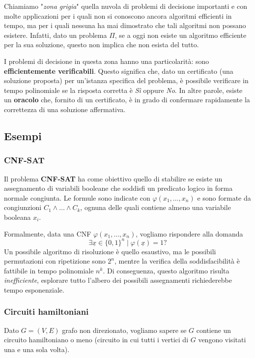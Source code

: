Chiamiamo "\textit{zona grigia}" quella nuvola di problemi di decisione importanti e con molte applicazioni per i quali non si conoscono ancora algoritmi efficienti in tempo, ma per i quali nessuna ha mai dimostrato che tali algoritmi non possano esistere. Infatti, dato un problema $\Pi$, se a oggi non esiste un algoritmo efficiente per la sua soluzione, questo non implica che non esista del tutto.

I problemi di decisione in questa zona hanno una particolarità: sono \textbf{efficientemente verificabili}. Questo significa che, dato un certificato (una soluzione proposta) per un'istanza specifica del problema, è possibile verificare in tempo polinomiale se la risposta corretta è \textit{Sì} oppure \textit{No}. In altre parole, esiste un \textbf{oracolo} che, fornito di un certificato, è in grado di confermare rapidamente la correttezza di una soluzione affermativa.

\subsection{Esempi}

\subsubsection{CNF-SAT}

Il problema \textbf{CNF-SAT} ha come obiettivo quello di stabilire se esiste un assegnamento di variabili booleane che soddisfi un predicato logico in forma normale congiunta. Le formule sono indicate con $\varphi (x_1, \dots, x_n)$ e sono formate da congiunzioni $C_1 \wedge \dots \wedge C_k$, ognuna delle quali contiene almeno una variabile booleana $x_i$.

Formalmente, data una CNF $\varphi(x_1, \dots, x_n)$, vogliamo rispondere alla domanda
$$ \exists \underline{x} \in \{0,1\}^n \mid \varphi(\underline{x}) = 1 ?$$
Un possibile algoritmo di risoluzione è quello esaustivo, ma le possibili permutazioni con ripetizione sono $2^n$, mentre la verifica della soddisfacibilità è fattibile in tempo polinomiale $n^k$. Di conseguenza, questo algoritmo risulta \textit{inefficiente}, esplorare tutto l'albero dei possibili assegnamenti richiederebbe tempo esponenziale.

\subsubsection{Circuiti hamiltoniani}

Dato $G = (V,E)$ grafo non direzionato, vogliamo sapere se $G$ contiene un circuito hamiltoniano o meno (circuito in cui tutti i vertici di $G$ vengono visitati una e una sola volta).


